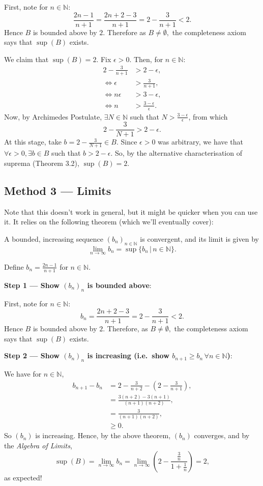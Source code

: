 \documentclass[
  12pt,
  a4paper]{extarticle}
\theoremstyle{plain}
\theoremstyle{definition}
\theoremstyle{plain}
\theoremstyle{plain}
\theoremstyle{plain}
\theoremstyle{plain}
\theoremstyle{definition}
\theoremstyle{definition}
\newtheorem*{Order Axioms*}{Order Axioms}\newtheorem{Order Axioms}{Order Axioms}[section]
\theoremstyle{remark}
\theoremstyle{remark}
\let\BeginKnitrBlock\begin \let\EndKnitrBlock\end
\renewcommand{\;}{\,}
\begin{document}
\BeginKnitrBlock{solution*}
First, note for \(n\in\mathbb{N}\): \[\frac{2n-1}{n+1} = \frac{2n+2-3}{n+1} = 2 - \frac{3}{n+1} < 2.\] Hence \(B\) is bounded above by \(2\). Therefore as \(B \neq \emptyset,\) the completeness axiom says that \(\sup(B)\) exists.

We claim that \(\sup(B) = 2.\) Fix \(\epsilon > 0.\) Then, for \(n \in \mathbb{N}:\)
\begin{align*}
2 - \frac{3}{n+1} &> 2-\epsilon,\\
\Leftrightarrow \epsilon &> \frac{3}{n+1},\\
\Leftrightarrow n\epsilon &> 3 - \epsilon,\\
\Leftrightarrow n &> \frac{3-\epsilon}{\epsilon}.
\end{align*}
Now, by Archimedes Postulate, \(\exists N \in \mathbb{N}\) such that \(N > \frac{3-\epsilon}{\epsilon}\), from which \[2 - \frac{3}{N+1} > 2- \epsilon.\] At this stage, take \(b = 2 - \frac{3}{N+1} \in B\). Since \(\epsilon > 0\) was arbitrary, we have that \(\forall \epsilon > 0, \exists b \in B\) such that \(b > 2-\epsilon.\) So, by the alternative characterisation of suprema (Theorem 3.2), \(\sup(B) = 2.\)
\EndKnitrBlock{solution*}

\hypertarget{method-3-limits}{%
\subsection*{Method 3 --- Limits}\label{method-3-limits}}

Note that this doesn't work in general, but it might be quicker when you can use it. It relies on the following theorem (which we'll eventually cover):
\BeginKnitrBlock{theorem}
{\label{thm:unnamed-chunk-5} }A bounded, increasing sequence \((b_n)_{n \in \mathbb{N}}\) is convergent, and its limit is given by \[\lim_{n \to \infty} b_n = \sup\lbrace b_n \,\lvert\, n \in \mathbb{N} \rbrace.\]
\EndKnitrBlock{theorem}

\BeginKnitrBlock{solution*}
Define \(b_n = \frac{2n - 1}{n+1}\) for \(n \in \mathbb{N}\).

\textbf{Step 1 --- Show \((b_n)_n\) is bounded above}:

First, note for \(n\in\mathbb{N}\): \[b_n = \frac{2n+2-3}{n+1} = 2 - \frac{3}{n+1} < 2.\] Hence \(B\) is bounded above by \(2\). Therefore, as \(B \neq \emptyset,\) the completeness axiom says that \(\sup(B)\) exists.

\textbf{Step 2 --- Show \((b_n)_n\) is increasing (i.e.~show \(b_{n+1} \geq b_n \; \forall n \in \mathbb{N}\))}:

We have for \(n \in \mathbb{N}\),
\begin{align*}
b_{n+1} - b_{n} &= 2 - \frac{3}{n+2} - \left(2 - \frac{3}{n+1}\right),\\
&= \frac{3(n+2)-3(n+1)}{(n+1)(n+2)},\\
&= \frac{3}{(n+1)(n+2)},\\
&\geq 0.
\end{align*}
So \((b_n)\) is increasing. Hence, by the above theorem, \((b_n)\) converges, and by the \emph{Algebra of Limits}, \[\sup(B) = \lim_{n \to \infty} b_n = \lim_{n \to \infty} \left(2 - \frac{\frac{3}{n}}{1 + \frac{1}{n}}\right) = 2,\]
as expected!
\EndKnitrBlock{solution*}
\end{document}
